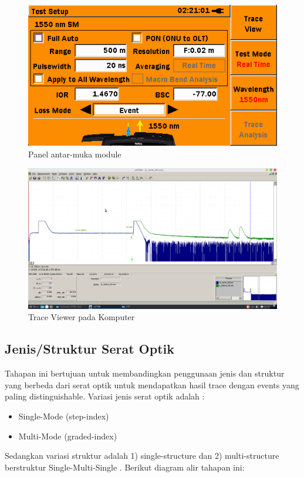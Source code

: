 \documentclass[12pt]{article}
\begin{document}
	\begin{figure}[h!]
		\centering
		\captionsetup{justification=centering}
		\includegraphics[width=0.5\linewidth]{images/Bab_3/Bab_3_4}
		\caption[panel antar-muka module]{\small{Panel antar-muka module }}
	\end{figure}

	\begin{figure}[h!]
		\centering
		\captionsetup{justification=centering}
		\includegraphics[width=0.7\linewidth]{images/Bab_3/Bab_3_5}
		\caption[Trace Viewer pada Komputer]{\small{Trace Viewer pada Komputer}}
	\end{figure}

	\subsection{Jenis/Struktur Serat Optik}
	
	Tahapan ini bertujuan untuk membandingkan penggunaan jenis dan struktur yang berbeda dari serat optik untuk mendapatkan hasil trace dengan events yang paling distinguishable.
	Variasi jenis serat optik adalah \cite{Hafid2014}:
	
	\begin{itemize}
		\item Single-Mode (step-index)
		\item Multi-Mode (graded-index)
	\end{itemize}

	Sedangkan variasi struktur adalah 1) single-structure dan 2) multi-structure berstruktur Single-Multi-Single \cite{Diana}.
	Berikut diagram alir tahapan ini:
	
\end{document}
